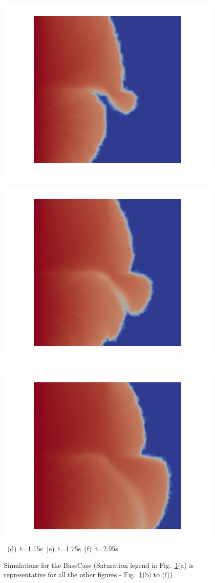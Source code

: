 \begin{landscape}
\begin{figure}[ht]
{\hbox{
      \includegraphics[width=.56\textwidth]{./Pics/BaseCase/BaseCase_Saturation_t_1dot15.png}
      \includegraphics[width=.56\textwidth]{./Pics/BaseCase/BaseCase_Saturation_t_1dot75.png} 
      \includegraphics[width=.56\textwidth]{./Pics/BaseCase/BaseCase_Saturation_t_2dot95.png}}
\vspace{0.cm}
\hbox{ \hspace{2.5cm} (d) t=1.15s \hspace{5.5cm} (e) t=1.75s   \hspace{5.5cm} (f) t=2.95s}
\vspace{0.cm}
}   
\caption{Simulations for the BaseCase (Saturation legend in Fig.~\ref{fig:BaseCase_Saturation}(a) is representative for all the other figures - \ie Fig.~\ref{fig:BaseCase_Saturation}(b) to (f))}
\label{fig:BaseCase_Saturation}
\end{figure}
\end{landscape}
\clearpage


